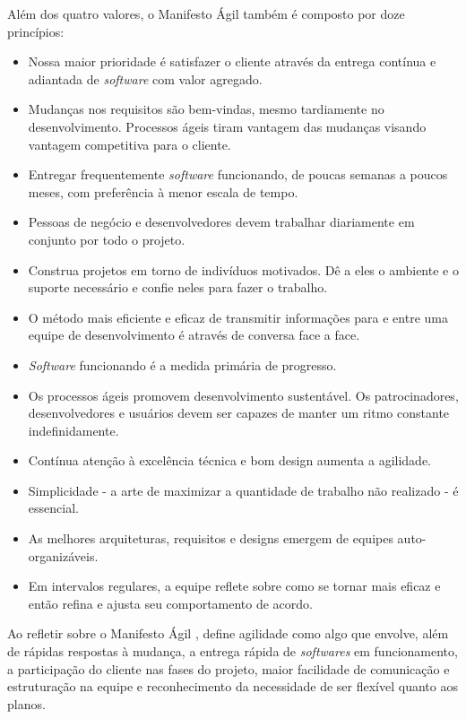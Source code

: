 \documentclass[
    12pt,       %
    openright,      %
    twoside,      %
    a4paper,      %
    english,      %
    french,       %
    spanish,      %
    brazil,       %
    ]{abntex2}
\begin{document}
Além dos quatro valores, o Manifesto Ágil \cite{AGILEMANIFEST:2001} também é composto por doze princípios: 

\begin{itemize}
        \item Nossa maior prioridade é satisfazer o cliente através da entrega contínua e adiantada de \textit{software} com valor agregado.
        \item Mudanças nos requisitos são bem-vindas, mesmo tardiamente no desenvolvimento. Processos ágeis tiram vantagem das mudanças visando vantagem competitiva para o cliente.
        \item Entregar frequentemente \textit{software} funcionando, de poucas semanas a poucos meses, com preferência à menor escala de tempo.
        \item Pessoas de negócio e desenvolvedores devem trabalhar diariamente em conjunto por todo o projeto.
        \item Construa projetos em torno de indivíduos motivados. Dê a eles o ambiente e o suporte necessário e confie neles para fazer o trabalho.
        \item O método mais eficiente e eficaz de transmitir informações para e entre uma equipe de desenvolvimento é através de conversa face a face.
        \item \textit{Software} funcionando é a medida primária de progresso.
        \item Os processos ágeis promovem desenvolvimento sustentável. Os patrocinadores, desenvolvedores e usuários devem ser capazes de manter um ritmo constante indefinidamente.
        \item Contínua atenção à excelência técnica e bom design aumenta a agilidade.
        \item Simplicidade - a arte de maximizar a quantidade de trabalho não realizado - é essencial.
        \item As melhores arquiteturas, requisitos e designs emergem de equipes auto-organizáveis.
        \item Em intervalos regulares, a equipe reflete sobre como se tornar mais eficaz e então refina e ajusta seu comportamento de acordo.
\end{itemize}

Ao refletir sobre o Manifesto Ágil \cite{AGILEMANIFEST:2001},  define agilidade como algo que envolve, além de rápidas respostas à mudança, a entrega rápida de \textit{softwares} em funcionamento, a participação do cliente nas fases do projeto, maior facilidade de comunicação e estruturação na equipe e reconhecimento da necessidade de ser flexível quanto aos planos.
\end{document}
